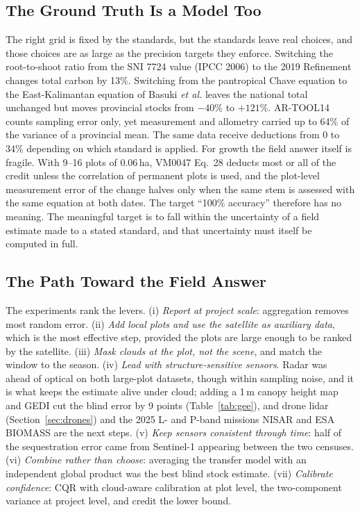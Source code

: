 \documentclass[conference,a4paper]{IEEEtran}
\begin{document}
\subsection{The Ground Truth Is a Model Too}
The right grid is fixed by the standards, but the standards leave real choices, and those choices are as large as the precision targets they enforce. Switching the root-to-shoot ratio from the SNI 7724 value (IPCC 2006) to the 2019 Refinement changes total carbon by 13\%. Switching from the pantropical Chave equation to the East-Kalimantan equation of Basuki \textit{et al.} leaves the national total unchanged but moves provincial stocks from $-40$\% to $+121$\%. AR-TOOL14 counts sampling error only, yet measurement and allometry carried up to 64\% of the variance of a provincial mean. The same data receive deductions from 0 to 34\% depending on which standard is applied. For growth the field answer itself is fragile. With 9--16 plots of 0.06\,ha, VM0047 Eq.~28 deducts most or all of the credit unless the correlation of permanent plots is used, and the plot-level measurement error of the change halves only when the same stem is assessed with the same equation at both dates. The target ``100\% accuracy'' therefore has no meaning. The meaningful target is to fall within the uncertainty of a field estimate made to a stated standard, and that uncertainty must itself be computed in full.

\subsection{The Path Toward the Field Answer}
The experiments rank the levers. (i) \emph{Report at project scale}: aggregation removes most random error. (ii) \emph{Add local plots and use the satellite as auxiliary data}, which is the most effective step, provided the plots are large enough to be ranked by the satellite. (iii) \emph{Mask clouds at the plot, not the scene}, and match the window to the season. (iv) \emph{Lead with structure-sensitive sensors}. Radar was ahead of optical on both large-plot datasets, though within sampling noise, and it is what keeps the estimate alive under cloud; adding a 1\,m canopy height map and GEDI cut the blind error by 9 points (Table~\ref{tab:gee}), and drone lidar (Section~\ref{sec:drones}) and the 2025 L- and P-band missions NISAR and ESA BIOMASS are the next steps. (v) \emph{Keep sensors consistent through time}: half of the sequestration error came from Sentinel-1 appearing between the two censuses. (vi) \emph{Combine rather than choose}: averaging the transfer model with an independent global product was the best blind stock estimate. (vii) \emph{Calibrate confidence}: CQR with cloud-aware calibration at plot level, the two-component variance at project level, and credit the lower bound.
\end{document}
